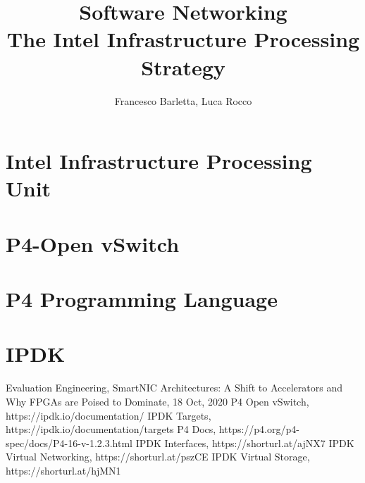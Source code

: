 \documentclass{article}
\title{
    Software Networking \\
    \large The Intel Infrastructure Processing Strategy}
\begin{document}
\author{Francesco Barletta, Luca Rocco}

\maketitle

\tableofcontents

\clearpage

\section{Intel\raisebox {1mm}{\textregistered} Infrastructure Processing Unit}


\section{P4-Open vSwitch}


\section{P4 Programming Language}


\section{IPDK}


\clearpage

\printnoidxglossary[type=acronym]
\printacronyms

\clearpage

\begin{thebibliography}{1}
    Evaluation Engineering, SmartNIC Architectures: A Shift to Accelerators and Why FPGAs are Poised to Dominate, 18 Oct, 2020
    P4 Open vSwitch, https://ipdk.io/documentation/
    IPDK Targets, https://ipdk.io/documentation/targets
    P4 Docs, https://p4.org/p4-spec/docs/P4-16-v-1.2.3.html
    IPDK Interfaces, https://shorturl.at/ajNX7
    IPDK Virtual Networking, https://shorturl.at/pszCE
    IPDK Virtual Storage, https://shorturl.at/hjMN1
\end{thebibliography}
\end{document}
